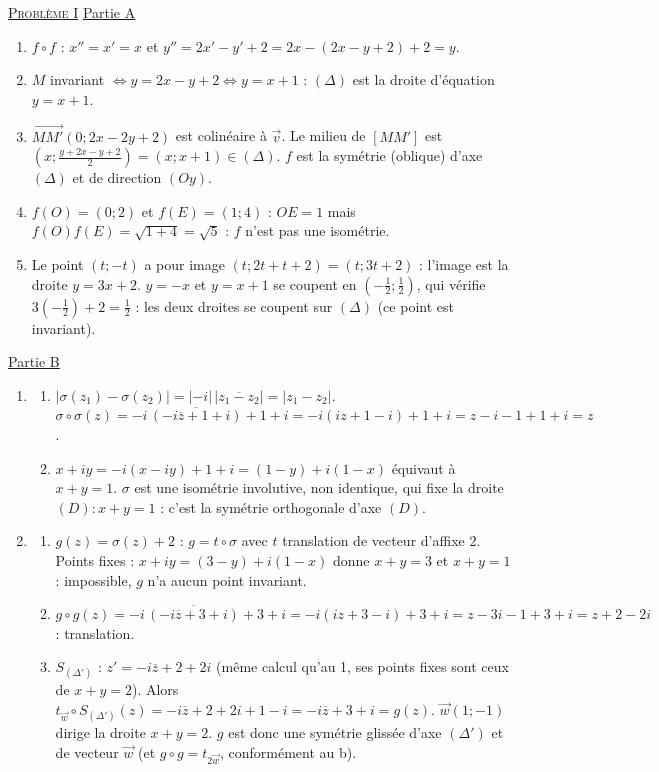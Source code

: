 \begin{corrige}
\noindent \underline{\textsc{Probl\`eme I}} \newline
\underline{Partie A}
\begin{enumerate}
\item $f \circ f$ : $x'' = x' = x$ et $y'' = 2x' - y' + 2 = 2x - (2x - y + 2) + 2 = y$.
\item $M$ invariant $\iff y = 2x - y + 2 \iff y = x + 1$ : $(\Delta)$ est la droite d'\'equation $y = x + 1$.
\item $\overrightarrow{MM'}(0 ; 2x - 2y + 2)$ est colin\'eaire \`a $\vec{v}$. Le milieu de $[MM']$ est $\left(x ; \frac{y + 2x - y + 2}{2}\right) = (x ; x + 1) \in (\Delta)$.
      $f$ est la sym\'etrie (oblique) d'axe $(\Delta)$ et de direction $(Oy)$.
\item $f(O) = (0 ; 2)$ et $f(E) = (1 ; 4)$ : $OE = 1$ mais $f(O)f(E) = \sqrt{1 + 4} = \sqrt{5}$ : $f$ n'est pas une isom\'etrie.
\item Le point $(t ; -t)$ a pour image $(t ; 2t + t + 2) = (t ; 3t + 2)$ : l'image est la droite $y = 3x + 2$.
      $y = -x$ et $y = x + 1$ se coupent en $\left(-\frac{1}{2} ; \frac{1}{2}\right)$, qui v\'erifie $3\left(-\frac{1}{2}\right) + 2 = \frac{1}{2}$ :
      les deux droites se coupent sur $(\Delta)$ (ce point est invariant).
\end{enumerate}
\underline{Partie B}
\begin{enumerate}
\item \begin{enumerate}
      \item $|\sigma(z_1) - \sigma(z_2)| = |-i|\,|\overline{z_1 - z_2}| = |z_1 - z_2|$.
            $\sigma \circ \sigma(z) = -i\,\overline{(-i\overline{z} + 1 + i)} + 1 + i = -i(iz + 1 - i) + 1 + i = z - i - 1 + 1 + i = z$.
      \item $x + iy = -i(x - iy) + 1 + i = (1 - y) + i(1 - x)$ \'equivaut \`a $x + y = 1$. $\sigma$ est une isom\'etrie involutive, non identique,
            qui fixe la droite $(D) : x + y = 1$ : c'est la sym\'etrie orthogonale d'axe $(D)$.
      \end{enumerate}
\item \begin{enumerate}
      \item $g(z) = \sigma(z) + 2$ : $g = t \circ \sigma$ avec $t$ translation de vecteur d'affixe $2$. Points fixes : $x + iy = (3 - y) + i(1 - x)$
            donne $x + y = 3$ et $x + y = 1$ : impossible, $g$ n'a aucun point invariant.
      \item $g \circ g(z) = -i\,\overline{(-i\overline{z} + 3 + i)} + 3 + i = -i(iz + 3 - i) + 3 + i = z - 3i - 1 + 3 + i = z + 2 - 2i$ : translation.
      \item $S_{(\Delta')}$ : $z' = -i\overline{z} + 2 + 2i$ (m\^eme calcul qu'au 1, ses points fixes sont ceux de $x + y = 2$). Alors
            $t_{\vec{w}} \circ S_{(\Delta')}(z) = -i\overline{z} + 2 + 2i + 1 - i = -i\overline{z} + 3 + i = g(z)$.
            $\vec{w}(1 ; -1)$ dirige la droite $x + y = 2$. $g$ est donc une sym\'etrie gliss\'ee d'axe $(\Delta')$ et de vecteur $\vec{w}$
            (et $g \circ g = t_{2\vec{w}}$, conform\'ement au b).
      \end{enumerate}
\end{enumerate}


\end{corrige}
